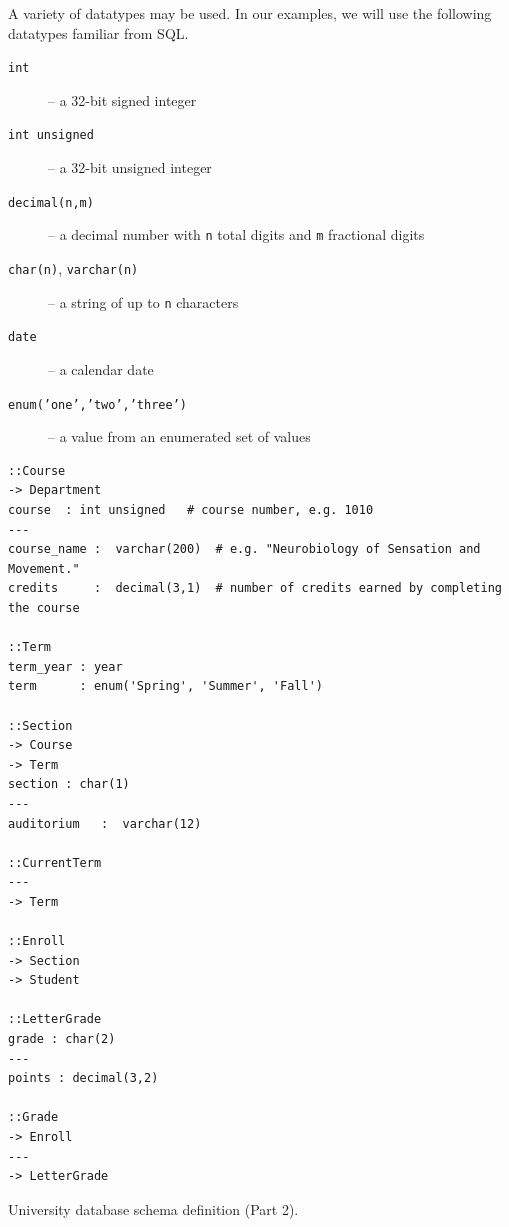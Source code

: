 \documentclass[letter,10pt]{article}
\begin{document}
A variety of datatypes may be used.  In our examples, we will use the following datatypes familiar from SQL.
\begin{description}
\item[{\tt int}] --  a 32-bit signed integer 
\item[{\tt int unsigned}] -- a 32-bit unsigned integer
\item[{\tt decimal(n,m)}] -- a decimal number with {\tt n} total digits and {\tt m} fractional digits
\item[{\tt char(n)}, {\tt varchar(n)}] -- a string of up to {\tt n} characters
\item[{\tt date}] -- a calendar date
\item[{\tt enum('one','two','three')}] -- a value from an enumerated set of values
\end{description}

\begin{lstfloat*}
\begin{lstlisting}[language=dj]
::Course     
-> Department
course  : int unsigned   # course number, e.g. 1010
---
course_name :  varchar(200)  # e.g. "Neurobiology of Sensation and Movement."
credits     :  decimal(3,1)  # number of credits earned by completing the course

::Term
term_year : year 
term      : enum('Spring', 'Summer', 'Fall')

::Section 
-> Course
-> Term 
section : char(1)
---
auditorium   :  varchar(12)

::CurrentTerm
---
-> Term

::Enroll
-> Section
-> Student 

::LetterGrade
grade : char(2)
---
points : decimal(3,2)

::Grade 
-> Enroll
---
-> LetterGrade

\end{lstlisting}
\caption{University database schema definition (Part 2).}
\label{lst:uni2}
\end{lstfloat*}
\end{document}
